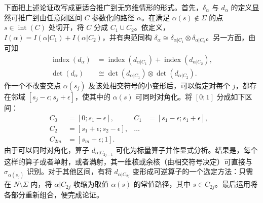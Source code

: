 下面把上述论证改写成更适合推广到无穷维情形的形式。首先，$\delta_\alpha$ 与 $d_\alpha$ 的定义显然可推广到由任意闭区间 $C$ 参数化的路径 $\alpha$。在满足 $\alpha(s)\notin\Sigma$ 的点 $s\in\operatorname{int}(C)$ 处切开，将 $C$ 分成 $C_1\cup C_2$。依定义，$I(\alpha)=I(\alpha|C_1)+I(\alpha|C_2)$，并有典范同构 $\delta_\alpha\cong\delta_{\alpha|C_1}\otimes\delta_{\alpha|C_2}$。另一方面，由可知
\begin{equation}\label{eq:11.8}
\begin{aligned}
\operatorname{index}(d_\alpha)&=\operatorname{index}(d_{\alpha|C_1})+\operatorname{index}(d_{\alpha|C_2}),\\
\det(d_\alpha)&\cong\det(d_{\alpha|C_1})\otimes\det(d_{\alpha|C_2}).
\end{aligned}
\end{equation}
作一个不改变交点 $\alpha(s_j)$ 及该处相交符号的小变形后，可以假定对每个 $j$，都存在邻域
$[s_j-\epsilon;s_j+\epsilon]$，使其中的 $\alpha(s)$ 可同时对角化。将 $[0;1]$ 分成如下区间：
\[
\begin{aligned}
C_0&=[0;s_1-\epsilon],&C_1&=[s_1-\epsilon;s_1+\epsilon],\\
C_2&=[s_1+\epsilon;s_2-\epsilon],&\ldots&&\\
C_{2m}&=[s_m+\epsilon;1].
\end{aligned}
\]
由于可以同时对角化，算子 $d_{\alpha|C_{2j-1}}$ 可化为标量算子并作显式分析。结果是，每个这样的算子或者单射，或者满射，其一维核或余核（由相交符号决定）可直接与 $\sigma_{\alpha(s_j)}$ 识别。对于其他区间，有将 $d_{\alpha|C_{2j}}$ 变形成可逆算子的一个选定方法：只需在 $N\setminus\Sigma$ 内，将 $\alpha|C_{2j}$ 收缩为取值 $\alpha(s)$ 的常值路径，其中 $s\in C_{2j}$。最后运用将各部分重新组合，便完成论证。


